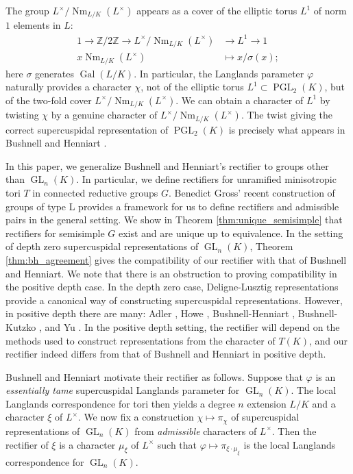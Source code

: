 \documentclass[11pt]{amsart}
\theoremstyle{plain}
\theoremstyle{definition}
\DeclareMathOperator{\Gal}{Gal}
\DeclareMathOperator{\Nm}{Nm}
\DeclareMathOperator{\GL}{GL}
\DeclareMathOperator{\PGL}{PGL}
\newcommand{\Lx}{L^\times}
\begin{document}
The group $\Lx / \Nm_{L/K}(\Lx)$ appears as a cover of the elliptic torus $L^1$ of norm $1$ elements in $L$:
\begin{align*}
1 \rightarrow \mathbb{Z} / 2 \mathbb{Z} \rightarrow \Lx / \Nm_{L/K}(\Lx) &\rightarrow L^1 \rightarrow 1 \\
x \Nm_{L/K}(L^{\times}) &\mapsto x / \sigma(x);
\end{align*}
here $\sigma$ generates $\Gal(L/K)$.  In particular, the Langlands parameter
$\varphi$ naturally provides a character $\chi$, not of the elliptic torus
$L^1 \subset \PGL_2(K)$,
but of the two-fold cover $\Lx / \Nm_{L/K}(\Lx)$.  We can obtain a character of $L^1$
by twisting $\chi$ by a genuine character of
$\Lx / \Nm_{L/K}(\Lx)$.  The twist giving the correct supercuspidal representation of $\PGL_2(K)$
is precisely what appears in Bushnell and Henniart \cite{bushnell-henniart:06a,bushnell-henniart:10a}.

In this paper, we generalize Bushnell and Henniart's
rectifier to groups other than $\GL_n(K)$.  In particular, we define rectifiers for
unramified minisotropic tori $T$ in connected reductive groups $G$.
Benedict Gross' recent construction of groups of type L provides a framework for
us to define rectifiers and admissible pairs in the general setting.
We show in Theorem \ref{thm:unique_semisimple} that rectifiers for semisimple $G$ exist
and are unique up to equivalence. In the setting of depth zero
supercuspidal representations of $\GL_{n}(K)$, Theorem \ref{thm:bh_agreement}
gives the compatibility of our rectifier with that of Bushnell and Henniart.
We note that there is an obstruction to proving compatibility in the positive depth case.
In the depth zero case, Deligne-Lusztig representations provide a canonical way of
constructing supercuspidal representations. However, in positive depth there are many:
Adler \cite{adler:98a}, Howe \cite{howe:77a}, Bushnell-Henniart \cite{bushnell-henniart:10a}, 
Bushnell-Kutzko \cite{bushnell-kutzko:AdmissibleDual}, and Yu \cite{yu:03a}.
In the positive depth setting, the rectifier will depend on the methods
used to construct representations from the character of $T(K)$, and
our rectifier indeed differs from that of Bushnell and Henniart in positive depth.

Bushnell and Henniart motivate their rectifier as follows.
Suppose that $\varphi$ is an \emph{essentially tame} supercuspidal Langlands parameter for
$\GL_n(K)$.  The local Langlands correspondence for tori then yields a degree $n$ extension
$L/K$ and a character $\xi$ of $L^{\times}$.  We now fix a construction $\chi \mapsto \pi_{\chi}$
of supercuspidal representations of $\GL_n(K)$ from \emph{admissible} characters of $L^{\times}$.
Then the rectifier of $\xi$ is a character $\mu_{\xi}$ of $L^{\times}$ such that
$\varphi \mapsto \pi_{\xi \cdot \mu_{\xi}}$ is the local Langlands correspondence for $\GL_n(K)$.
\end{document}
